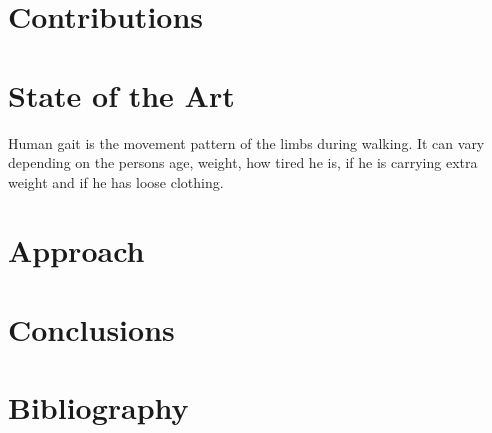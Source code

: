 \documentclass[12pt]{article}
\theoremstyle{definition}
\begin{document}
	\newpage
	
	\section{Contributions}
	\vspace{1cm}
	
	\newpage
	
	\section{State of the Art}
	\vspace{1cm}
	
	Human gait is the movement pattern of the limbs during walking. It can vary depending on the persons age, weight, how tired he is, if he is carrying extra weight and if he has loose clothing.
	
	\newpage
	
	\section{Approach}
	\vspace{1cm}
	
	\newpage
	
	\section{Conclusions}
	\vspace{1cm}
	
	\newpage
	
	\section{Bibliography}
	
	
	
\end{document}
